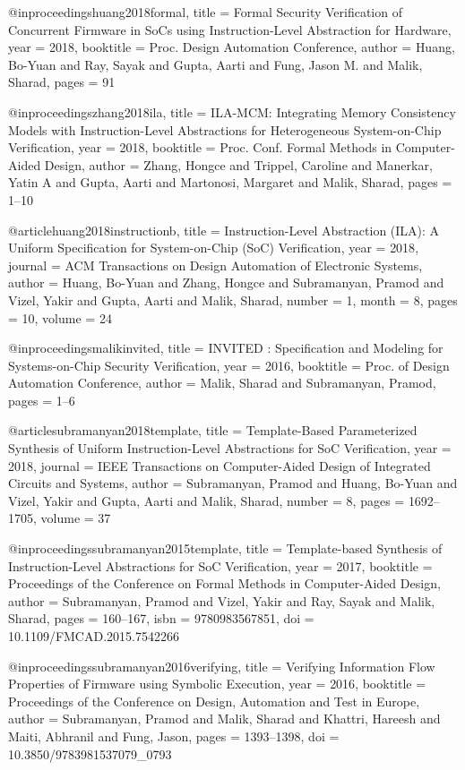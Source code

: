 @inproceedings{huang2018formal,
    title = {{Formal Security Verification of Concurrent Firmware in SoCs using Instruction-Level Abstraction for Hardware}},
    year = {2018},
    booktitle = {Proc. Design Automation Conference},
    author = {Huang, Bo-Yuan and Ray, Sayak and Gupta, Aarti and Fung, Jason M. and Malik, Sharad},
    pages = {91}
}

@inproceedings{zhang2018ila,
    title = {{ILA-MCM: Integrating Memory Consistency Models with Instruction-Level Abstractions for Heterogeneous System-on-Chip Verification}},
    year = {2018},
    booktitle = {Proc. Conf. Formal Methods in Computer-Aided Design},
    author = {Zhang, Hongce and Trippel, Caroline and Manerkar, Yatin A and Gupta, Aarti and Martonosi, Margaret and Malik, Sharad},
    pages = {1--10}
}

@article{huang2018instructionb,
    title = {{Instruction-Level Abstraction (ILA): A Uniform Specification for System-on-Chip (SoC) Verification}},
    year = {2018},
    journal = {ACM Transactions on Design Automation of Electronic Systems},
    author = {Huang, Bo-Yuan and Zhang, Hongce and Subramanyan, Pramod and Vizel, Yakir and Gupta, Aarti and Malik, Sharad},
    number = {1},
    month = {8},
    pages = {10},
    volume = {24}
}

@inproceedings{malikinvited,
    title = {{INVITED : Specification and Modeling for Systems-on-Chip Security Verification}},
    year = {2016},
    booktitle = {Proc. of Design Automation Conference},
    author = {Malik, Sharad and Subramanyan, Pramod},
    pages = {1--6}
}

@article{subramanyan2018template,
    title = {{Template-Based Parameterized Synthesis of Uniform Instruction-Level Abstractions for SoC Verification}},
    year = {2018},
    journal = {IEEE Transactions on Computer-Aided Design of Integrated Circuits and Systems},
    author = {Subramanyan, Pramod and Huang, Bo-Yuan and Vizel, Yakir and Gupta, Aarti and Malik, Sharad},
    number = {8},
    pages = {1692--1705},
    volume = {37}
}

@inproceedings{subramanyan2015template,
    title = {{Template-based Synthesis of Instruction-Level Abstractions for SoC Verification}},
    year = {2017},
    booktitle = {Proceedings of the Conference on Formal Methods in Computer-Aided Design},
    author = {Subramanyan, Pramod and Vizel, Yakir and Ray, Sayak and Malik, Sharad},
    pages = {160--167},
    isbn = {9780983567851},
    doi = {10.1109/FMCAD.2015.7542266}
}

@inproceedings{subramanyan2016verifying,
    title = {{Verifying Information Flow Properties of Firmware using Symbolic Execution}},
    year = {2016},
    booktitle = {Proceedings of the Conference on Design, Automation and Test in Europe},
    author = {Subramanyan, Pramod and Malik, Sharad and Khattri, Hareesh and Maiti, Abhranil and Fung, Jason},
    pages = {1393--1398},
    doi = {10.3850/9783981537079{\_}0793}
}

